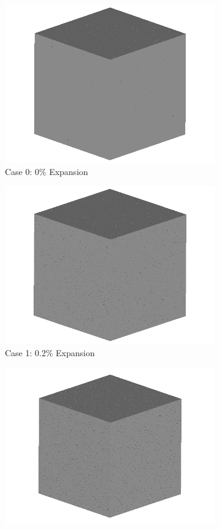 \begin{figure}[ht!]
\centering

    \begin{subfigure}{.5\textwidth}
      \centering
      \includegraphics[width=.8\linewidth]{Files/exp_3D/ASR/A30Undamaged.png} %
    \caption{Case 0: 0\% Expansion}
    \end{subfigure}%
    \begin{subfigure}{.5\textwidth}
      \centering
      \includegraphics[width=.8\linewidth]{Files/exp_3D/DEF/A30X-1C_1_3d.png}
    \caption{Case 1: 0.2\% Expansion}
    \end{subfigure}
    \begin{subfigure}{.5\textwidth}
      \centering
      \includegraphics[width=.8\linewidth]{Files/exp_3D/DEF/A30X-1C_2_3d.png}

\end{subfigure}
\end{figure}
